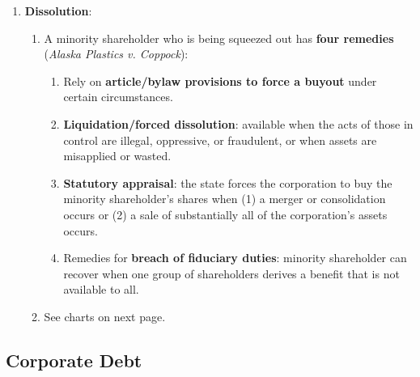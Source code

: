 \begin{enumerate}
    \item \textbf{Dissolution}:
    \begin{enumerate}
        \item A minority shareholder who is being squeezed out has 
        \textbf{four remedies} (\emph{Alaska Plastics v. Coppock}):
        \begin{enumerate}
            \item Rely on \textbf{article/bylaw provisions to force a buyout} 
            under certain circumstances.
            \item \textbf{Liquidation/forced dissolution}: available when the 
            acts of those in control are illegal, oppressive, or fraudulent, 
            or when assets are misapplied or wasted.
            \item \textbf{Statutory appraisal}: the state forces the 
            corporation to buy the minority shareholder's shares when (1) a 
            merger or consolidation occurs or (2) a sale of substantially all 
            of the corporation's assets occurs.
            \item Remedies for \textbf{breach of fiduciary duties}: minority 
            shareholder can recover when one group of shareholders derives a 
            benefit that is not available to all.
        \end{enumerate}
        \item See charts on next page.
    \end{enumerate}
\end{enumerate}




\newpage

\subsection{Corporate Debt}

